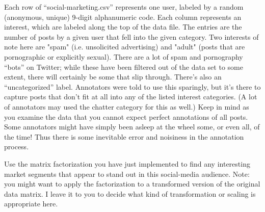 \documentclass{mynotes}
\begin{document}
Each row of ``social-marketing.csv'' represents one user, labeled by a random (anonymous, unique) 9-digit alphanumeric code. Each column represents an interest, which are labeled along the top of the data file. The entries are the number of posts by a given user that fell into the given category. Two interests of note here are "spam" (i.e. unsolicited advertising) and "adult" (posts that are pornographic or explicitly sexual). There are a lot of spam and pornography ``bots'' on Twitter; while these have been filtered out of the data set to some extent, there will certainly be some that slip through. There's also an ``uncategorized'' label. Annotators were told to use this sparingly, but it's there to capture posts that don't fit at all into any of the listed interest categories. (A lot of annotators may used the chatter category for this as well.) Keep in mind as you examine the data that you cannot expect perfect annotations of all posts. Some annotators might have simply been asleep at the wheel some, or even all, of the time! Thus there is some inevitable error and noisiness in the annotation process.

Use the matrix factorization you have just implemented to find any interesting market segments that appear to stand out in this social-media audience.  Note: you might want to apply the factorization to a transformed version of the original data matrix.  I leave it to you to decide what kind of transformation or scaling is appropriate here.
\end{document}
